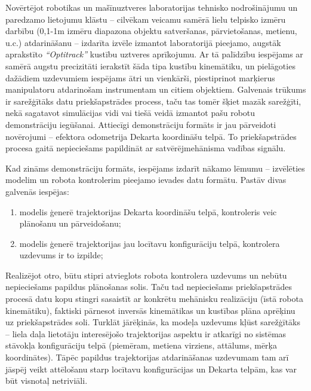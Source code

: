 \documentclass[12pt, a4paper]{article}
\numberwithin{equation}{section} %
\begin{document}
Novērtējot robotikas un mašīnuztveres laboratorijas tehnisko nodrošinājumu un paredzamo lietojumu klāstu -- cilvēkam veicamu samērā lielu telpisko izmēru darbību (0,1-1m izmēru diapazona objektu satveršanas, pārvietošanas, metienu, u.c.) atdarināšanu -- izdarīta izvēle izmantot laboratorijā pieejamo, augstāk aprakstīto \textit{``Optitrack''} kustību uztveres aprīkojumu. Ar tā palīdzību iespējams ar samērā augstu precizitāti ierakstīt šāda tipa kustību kinemātiku, un pielāgoties dažādiem uzdevumiem iespējams ātri un vienkārši, piestiprinot marķierus manipulatoru atdarinošam instrumentam un citiem objektiem. Galvenais trūkums ir sarežģītāks datu priekšapstrādes process, taču tas tomēr šķiet mazāk sarežģīti, nekā sagatavot simulācijas vidi vai tiešā veidā izmantot pašu robotu demonstrāciju iegūšanai. Attiecīgi demonstrāciju formāts ir jau pārveidoti novērojumi -- efektora odometrija Dekarta koordināšu telpā. To priekšapstrādes procesa gaitā nepieciešams papildināt ar satvērējmehānisma vadības signālu.

Kad zināms demonstrāciju formāts, iespējams izdarīt nākamo lēmumu -- izvēlēties modelim un robota kontrolerim pieejamo ievades datu formātu. Pastāv divas galvenās iespējas:

\begin{enumerate}
    \item modelis ģenerē trajektorijas Dekarta koordināšu telpā, kontroleris veic plānošanu un pārveidošanu;
    \item modelis ģenerē trajektorijas jau locītavu konfigurāciju telpā, kontrolera uzdevums ir to izpilde;
\end{enumerate}

Realizējot otro, būtu stipri atvieglots robota kontrolera uzdevums un nebūtu nepieciešams papildus plānošanas solis. Taču tad nepieciešams priekšapstrādes procesā datu kopu stingri sasaistīt ar konkrētu mehānisku realizāciju (īstā robota kinemātiku), faktiski pārnesot inversās kinemātikas un kustības plāna aprēķinu uz priekšapstrādes soli. Turklāt jārēķinās, ka modeļa uzdevums kļūst sarežģītāks -- liela daļa lietotāju interesējošo trajektorijas aspektu ir atkarīgi no sistēmas stāvokļa konfigurāciju telpā (piemēram, metiena virziens, attālums, mērķa koordinātes). Tāpēc papildus trajektorijas atdarināšanas uzdevumam tam arī jāspēj veikt attēlošanu starp locītavu konfigurācijas un Dekarta telpām, kas var būt visnotaļ netriviāli.  
\end{document}
